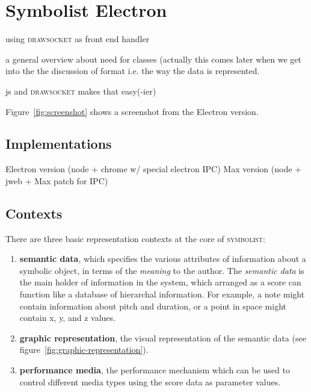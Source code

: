 \documentclass{article}
\def\symbolist{\textsc{symbolist}\xspace}
\def\drawsocket{\textsc{drawsocket}\xspace}
\begin{document}
\section{Symbolist Electron}\label{sec:symbolist_electron}

using \drawsocket as front end handler \cite{gottfried2019drawsocket}

\cite{hajdu2005quintet}

a general overview about need for classes (actually this comes later when we get into the the discussion of format i.e. the way the data is represented.

js and \drawsocket makes that easy(-ier)


Figure~\ref{fig:screenshot} shows a screenshot from the Electron version.



\subsection{Implementations}\label{sec:implementations}

Electron version (node + chrome w/ special electron IPC)
Max version (node + jweb + Max patch for IPC)

\subsection{Contexts}\label{subsec:contexts}

There are three basic representation contexts at the core of \symbolist:

\begin{enumerate}\itemsep0pt
\item \textbf{semantic data}, which specifies the various attributes of information about a symbolic object, in terms of the \textit{meaning} to the author. The  \textit{semantic data} is the main holder of information in the system, which arranged as a score can function like a database of hierarchal information. For example, a note might contain information about pitch and duration, or a point in space might contain x, y, and z values.
\item \textbf{graphic representation}, the visual representation of the semantic data (see figure~\ref{fig:graphic-representation}).
\item \textbf{performance media}, the performance mechanism which can be used to control different media types using the score data as parameter values. 
\end{enumerate}
\end{document}
